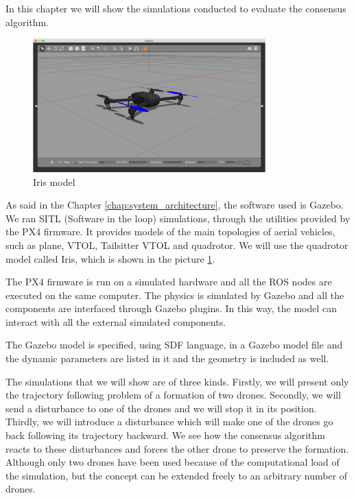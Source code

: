 In this chapter we will show the simulations conducted to evaluate the consensus algorithm.

\begin{figure}
\centering
\includegraphics[width=0.8\textwidth]{chapters/chapter-04/figures/iris_model.png}
\caption{Iris model}
\label{fig:iris_model}
\end{figure}

As said in the Chapter \ref{chap:system_architecture}, the software used is Gazebo.
We ran SITL (Software in the loop) simulations, through the utilities provided by
the PX4 firmware. It provides models of the main topologies of aerial vehicles,
such as plane, VTOL, Tailsitter VTOL and quadrotor.
We will use the quadrotor model called Iris, which is shown in the picture \ref{fig:iris_model}.

The PX4 firmware is run on a simulated hardware and all the ROS nodes are executed
on the same computer. The physics is simulated by Gazebo and all the components
are interfaced through Gazebo plugins. In this way, the model can interact with
all the external simulated components.

The Gazebo model is specified, using SDF language, in a Gazebo model file and
the dynamic parameters are listed in it and the geometry
is included as well.

The simulations that we will show are of three kinds. Firstly, we will present only
the trajectory following problem of a formation of two drones.
Secondly, we will send a disturbance to one of the drones and we will stop it
in its position. Thirdly, we will introduce a disturbance which will make one of the drones
go back following its trajectory backward.
We see how the consensus algorithm reacts to these disturbances and forces the other
drone to preserve the formation.
Although only two drones have been used because of the computational load of the simulation, but the
concept can be extended freely to an arbitrary number of drones.

